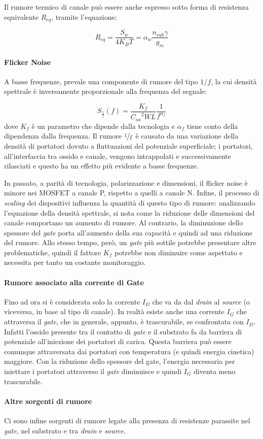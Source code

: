 Il rumore termico di canale può essere anche espresso sotto forma di resistenza equivalente $R_{eq}$, tramite l'equazione:

\begin{equation}
  R_{eq} = \frac{S_w}{4 K_B T} = \alpha_w \frac{n_{sub} \gamma}{g_m}
\end{equation}

\paragraph*{Flicker Noise}
A basse frequenze, prevale una componente di rumore del tipo $1/f$, la cui densità spettrale è inversamente proporzionale alla frequenza del segnale:

\begin{equation}
  S_{\frac{1}{f}} \left(f\right) = \frac{K_f}{{C_{ox}}^2 W L} \frac{1}{f^{\alpha_f}}
\end{equation}
dove $K_f$ è un parametro che dipende dalla tecnologia e $\alpha_f$ tiene conto della dipendenza dalla frequenza.
Il rumore $\sfrac{1}{f}$ è causato da una variazione della densità di portatori dovuto a fluttuazioni del potenziale superficiale; i portatori, all'interfaccia tra ossido e canale, vengono intrappolati e successivamente rilasciati e questo ha un effetto più evidente a basse frequenze.

In passato, a parità di tecnologia, polarizzazione e dimensioni, il flicker noise è minore nei MOSFET a canale P, rispetto a quelli a canale N. Infine, il processo di \emph{scaling} dei dispositivi influenza la quantità di questo tipo di rumore: analizzando l'equazione della densità spettrale, si nota come la riduzione delle dimensioni del canale comportano un aumento di rumore. Al contrario, la diminuzione dello spessore del \emph{gate} porta all'aumento della sua capacità e quindi ad una riduzione del rumore. Allo stesso tempo, però, un \emph{gate} più sottile potrebbe presentare altre problematiche, quindi il fattore $K_f$ potrebbe non diminuire come aspettato e necessita per tanto un costante monitoraggio. 

\paragraph*{Rumore associato alla corrente di Gate}
Fino ad ora si è considerata solo la corrente $I_D$ che va da dal \emph{drain} al \emph{source} (o viceversa, in base al tipo di canale). In realtà esiste anche una corrente $I_G$ che attraversa il \emph{gate}, che in generale, appunto, è trascurabile, se confrontata con  $I_D$. Infatti l'ossido presente tra il contatto di \emph{gate} e il substrato fa da barriera di potenziale all'iniezione dei portatori di carica. Questa barriera può essere comunque attraversata dai portatori con temperatura (e quindi energia cinetica) maggiore. Con la riduzione dello spessore del gate, l'energia necessaria per iniettare i portatori attraverso il \emph{gate} diminuisce e quindi $I_G$ diventa meno trascurabile.

\paragraph*{Altre sorgenti di rumore}
Ci sono infine sorgenti di rumore legate alla presenza di resistenze parassite nel \emph{gate}, nel substrato e tra \emph{drain} e \emph{source}.